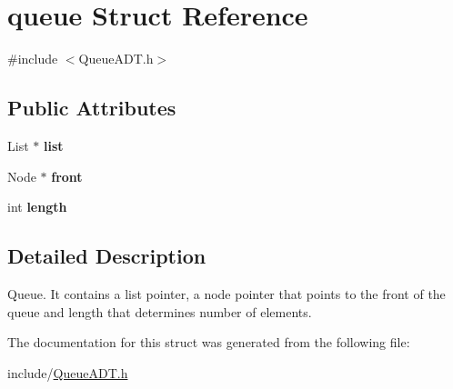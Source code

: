 \hypertarget{structqueue}{}\section{queue Struct Reference}
\label{structqueue}


{\ttfamily \#include $<$Queue\+A\+D\+T.\+h$>$}

\subsection*{Public Attributes}
\begin{DoxyCompactItemize}
\item 
\mbox{\label{structqueue_adc9a0c20099370037a33607c9aa8d263}} 
List $\ast$ {\bfseries list}
\item 
\mbox{\label{structqueue_a1a583a22b96c1b91194cb1e02446d7ab}} 
Node $\ast$ {\bfseries front}
\item 
\mbox{\label{structqueue_af2ce721719789280f495041c8151a445}} 
int {\bfseries length}
\end{DoxyCompactItemize}


\subsection{Detailed Description}
Queue. It contains a list pointer, a node pointer that points to the front of the queue and length that determines number of elements. 

The documentation for this struct was generated from the following file\+:\begin{DoxyCompactItemize}
\item 
include/\hyperlink{QueueADT_8h}{Queue\+A\+D\+T.\+h}\end{DoxyCompactItemize}
